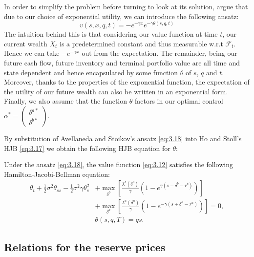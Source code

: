 In order to simplify the problem before turning to look at its solution, 
\textcite{AS2008} argue that due to our choice of exponential 
utility, we can introduce the following ansatz:
\begin{equation}\label{eq:3.18}
    v(s,x,q,t)=-e^{-\gamma x}e^{-\gamma\theta(s,q,t)}
\end{equation}
The intuition behind this is that considering our value function at 
time $t$, our current wealth $X_t$ is a predetermined constant and thus
measurable w.r.t $\mathcal{F}_t$. Hence we can take $-e^{-\gamma x}$
out from the expectation. The remainder, being our future cash flow, 
future inventory and terminal portfolio value are all time and state
dependent and hence encapsulated by some function $\theta$ of $s$, $q$
and $t$. Moreover, thanks to the properties of the exponential function, 
the expectation of the utility of our future wealth can also be 
written in an exponential form. Finally, we also assume that the function
$\theta$ factors in our optimal control $\alpha^*=\begin{pmatrix}\delta^{a*}\\\delta^{b*}\end{pmatrix}$.

By substitution of Avellaneda and Stoikov's ansatz \eqref{eq:3.18} into 
Ho and Stoll's HJB \eqref{eq:3.17} we obtain the following HJB equation
for $\theta$:
\begin{theorem}\label{thm:3.7.2}
    Under the ansatz \eqref{eq:3.18}, the value function \eqref{eq:3.12} satisfies 
    the following Hamilton-Jacobi-Bellman equation:
    \begin{equation}\label{eq:3.19}
            \begin{aligned}
                \theta_t+\frac{1}{2}\sigma^2\theta_{ss}-\frac{1}{2}\sigma^2\gamma\theta_{s}^2&+\max\limits_{\delta^b}\left[\frac{\lambda^b(\delta^b)}{\gamma}(1-e^{\gamma(s-\delta^b-r^b)})\right]\\
                &+\max\limits_{\delta^a}\left[\frac{\lambda^a(\delta^a)}{\gamma}(1-e^{-\gamma(s+\delta^a-r^a)})\right]=0,\\
                &\theta(s,q,T)=qs.
            \end{aligned}
    \end{equation}
\end{theorem}

\subsection*{Relations for the reserve prices}

